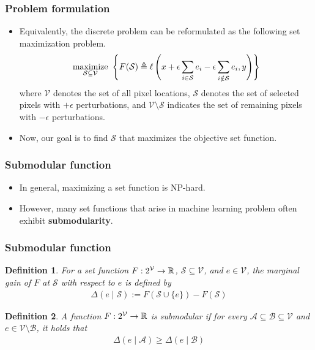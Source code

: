 \documentclass[10pt,mathserif]{beamer}
\newtheorem{defn}{Definition}
\begin{document}
\begin{frame}
\frametitle{Problem formulation}
\begin{itemize}\itemsep=20pt
\item Equivalently, the discrete problem can be reformulated as the following set maximization problem.
\begin{align*}
\operatorname*{maximize}_{\mathcal{S} \subseteq \mathcal{V}}~ \left\{ F(\mathcal{S}) \triangleq \ell \left(x + \epsilon \sum_{i \in \mathcal{S}}e_i - \epsilon \sum_{i \notin \mathcal{S}}e_i, y \right) \right\}
\end{align*}
where $\mathcal{V}$ denotes the set of all pixel locations, $\mathcal{S}$ denotes the set of selected pixels with $+\epsilon$ perturbations, and $\mathcal{V} \setminus \mathcal{S}$ indicates the set of remaining pixels with $-\epsilon$ perturbations. \pause
\item Now, our goal is to find $\mathcal{S}$ that maximizes the objective set function.
\end{itemize}
\end{frame}


\begin{frame}
\frametitle{Submodular function}
\begin{itemize}\itemsep=25pt
\item In general, maximizing a set function is NP-hard.\pause
\item However, many set functions that arise in machine learning problem often exhibit \textbf{submodularity}.
\end{itemize}
\end{frame}

\begin{frame}
\frametitle{Submodular function}
\begin{defn}
For a set function $F:2^{\mathcal{V}} \rightarrow \mathbb R$, $\mathcal{S} \subseteq \mathcal{V}$, and $e \in \mathcal{V}$, the marginal gain of $F$ at $\mathcal{S}$ with respect to $e$ is defined by
\begin{align*}
\Delta(e \mid \mathcal{S}) := F(\mathcal{S}\cup\{e\})-F(\mathcal{S})
\end{align*}
\end{defn}
\begin{defn}
A function $F:2^{\mathcal{V}} \rightarrow \mathbb R$ is submodular if for every $\mathcal{A} \subseteq \mathcal{B} \subseteq \mathcal{V}$ and $e \in \mathcal{V} \setminus \mathcal{B}$, it holds that
\begin{align*}
\Delta(e \mid \mathcal{A}) \geq \Delta(e \mid \mathcal{B})
\end{align*}
\end{defn}
\end{frame}
\end{document}

